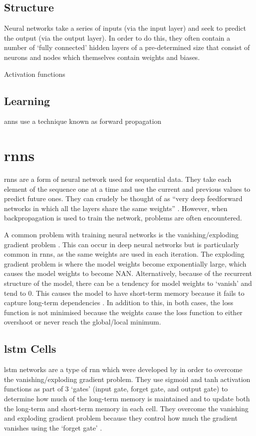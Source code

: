 \subsection{Structure}
\label{sec:background_anns_structure}
Neural networks take a series of inputs (via the input layer) and seek to predict the output (via the output layer). In order to do this, they often contain a number of `fully connected' hidden layers of a pre-determined size that consist of neurons and nodes which themselves contain weights and biases.

Activation functions

\subsection{Learning}
\label{sec:background_anns_learning}
\acrlong{ann}s use a technique known as forward propagation

\section{\acrlong{rnn}s}
\label{sec:background_rnns}
\acrlong{rnn}s are a form of neural network used for sequential data. They take each element of the sequence one at a time and use the current and previous values to predict future ones. They can crudely be thought of as ``very deep feedforward networks in which all the layers share the same weights'' \citep{Yann}. However, when backpropagation is used to train the network, problems are often encountered.

A common problem with training neural networks is the vanishing/exploding gradient problem \citep{hochreiter1997long}. This can occur in deep neural networks but is particularly common in \acrshort{rnn}s, as the same weights are used in each iteration. The exploding gradient problem is where the model weights become exponentially large, which causes the model weights to become NAN. Alternatively, because of the recurrent structure of the model, there can be a tendency for model weights to `vanish' and tend to 0. This causes the model to have short-term memory because it fails to capture long-term dependencies \citep{chung2014empirical}. In addition to this, in both cases, the loss function is not minimised because the weights cause the loss function to either overshoot or never reach the global/local minimum.

\subsection{\acrlong{lstm} Cells}
\label{sec:background_lstms}
\acrshort{lstm} networks are a type of \acrlong{rnn} which were developed by \citet{hochreiter1997long} in order to overcome the vanishing/exploding gradient problem. They use sigmoid and tanh activation functions as part of 3 `gates' (input gate, forget gate, and output gate) to determine how much of the long-term memory is maintained and to update both the long-term and short-term memory in each cell. They overcome the vanishing and exploding gradient problem because they control how much the gradient vanishes using the `forget gate' \citep{Gers}.

